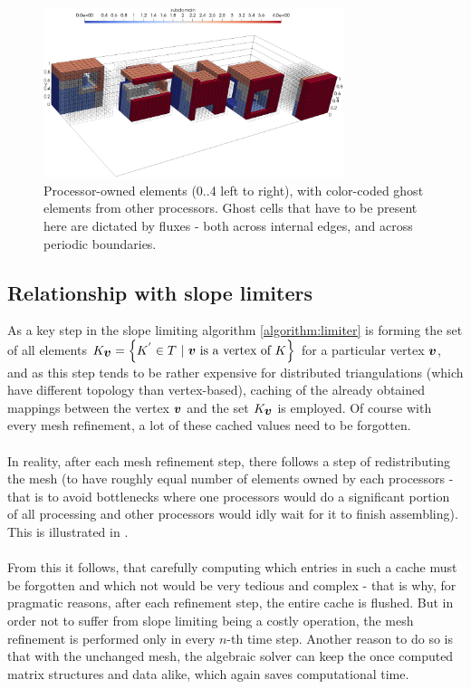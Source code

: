 \begin{figure}[H]
		\begin{center}
			\includegraphics[width=0.78\textwidth]{img/mesh/cube-periodic,ghost.jpg}
			\vspace{-2mm}
		\caption{Processor-owned elements (0..4 left to right), with color-coded ghost elements from other processors. Ghost cells that have to be present here are dictated by fluxes - both across internal edges, and across periodic boundaries.}
		\label{figure:ghostPer}
		\end{center}
	\end{figure}\vspace{-5mm}

\subsection{Relationship with slope limiters}
As a key step in the slope limiting algorithm \cref{algorithm:limiter} is forming the set of all elements $K_{\mbox{\boldmath $v$}} = \left\{K^{'}\in T\ |\ \mbox{\boldmath $v$} \text{ is a vertex of } K\right\}$ for a particular vertex $\mbox{\boldmath $v$}$, and as this step tends to be rather expensive for distributed triangulations (which have different topology than vertex-based), caching of the already obtained mappings between the vertex $\mbox{\boldmath $v$}$ and the set $K_{\mbox{\boldmath $v$}}$ is employed. Of course with every mesh refinement, a lot of these cached values need to be forgotten.
\paragraph{}
In reality, after each mesh refinement step, there follows a step of redistributing the mesh (to have roughly equal number of elements owned by each processors - that is to avoid bottlenecks where one processors would do a significant portion of all processing and other processors would idly wait for it to finish assembling). This is illustrated in .
\paragraph{}
From this it follows, that carefully computing which entries in such a cache must be forgotten and which not would be very tedious and complex - that is why, for pragmatic reasons, after each refinement step, the entire cache is flushed. But in order not to suffer from slope limiting being a costly operation, the mesh refinement is performed only in every $n$-th time step. Another reason to do so is that with the unchanged mesh, the algebraic solver can keep the once computed matrix structures and data alike, which again saves computational time.